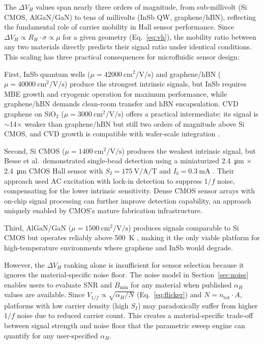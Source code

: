 \documentclass[preprint,review,12pt]{elsarticle}
\begin{document}
The $\Delta V_H$ values span nearly three orders of magnitude, from sub-millivolt (Si CMOS, AlGaN/GaN) to tens of millivolts (InSb QW, graphene/hBN), reflecting the fundamental role of carrier mobility in Hall sensor performance. Since $\Delta V_H \propto R_H \cdot \sigma \propto \mu$ for a given geometry (Eq.~\eqref{eq:vh}), the mobility ratio between any two materials directly predicts their signal ratio under identical conditions. This scaling has three practical consequences for microfluidic sensor design:

First, InSb quantum wells ($\mu = \SI{42000}{\centi\meter\squared\per\volt\per\second}$) and graphene/hBN ($\mu = \SI{40000}{\centi\meter\squared\per\volt\per\second}$) produce the strongest intrinsic signals, but InSb requires MBE growth and cryogenic operation for maximum performance, while graphene/hBN demands clean-room transfer and hBN encapsulation. CVD graphene on SiO$_2$ ($\mu = \SI{3000}{\centi\meter\squared\per\volt\per\second}$) offers a practical intermediate: its signal is ${\sim}$14$\times$ weaker than graphene/hBN but still two orders of magnitude above Si CMOS, and CVD growth is compatible with wafer-scale integration \cite{shah2023}.

Second, Si CMOS ($\mu = \SI{1400}{\centi\meter\squared\per\volt\per\second}$) produces the weakest intrinsic signal, but Besse et al.\ demonstrated single-bead detection using a miniaturized \SI{2.4}{\micro\meter} $\times$ \SI{2.4}{\micro\meter} CMOS Hall sensor with $S_I = \SI{175}{\volt\per\ampere\per\tesla}$ and $I_b = \SI{0.3}{\milli\ampere}$ \cite{besse2002}. Their approach used AC excitation with lock-in detection to suppress $1/f$ noise, compensating for the lower intrinsic sensitivity. Dense CMOS sensor arrays with on-chip signal processing can further improve detection capability, an approach uniquely enabled by CMOS's mature fabrication infrastructure.

Third, AlGaN/GaN ($\mu = \SI{1500}{\centi\meter\squared\per\volt\per\second}$) produces signals comparable to Si CMOS but operates reliably above \SI{500}{\kelvin} \cite{zhang2021}, making it the only viable platform for high-temperature environments where graphene and InSb would degrade.

However, the $\Delta V_H$ ranking alone is insufficient for sensor selection because it ignores the material-specific noise floor. The noise model in Section~\ref{sec:noise} enables users to evaluate SNR and $B_\text{min}$ for any material when published $\alpha_H$ values are available. Since $V_{1/f} \propto \sqrt{\alpha_H / N}$ (Eq.~\eqref{eq:flicker}) and $N = n_\text{tot} \cdot A$, platforms with low carrier density (high $S_I$) may paradoxically suffer from higher $1/f$ noise due to reduced carrier count. This creates a material-specific trade-off between signal strength and noise floor that the parametric sweep engine can quantify for any user-specified $\alpha_H$.
\end{document}
